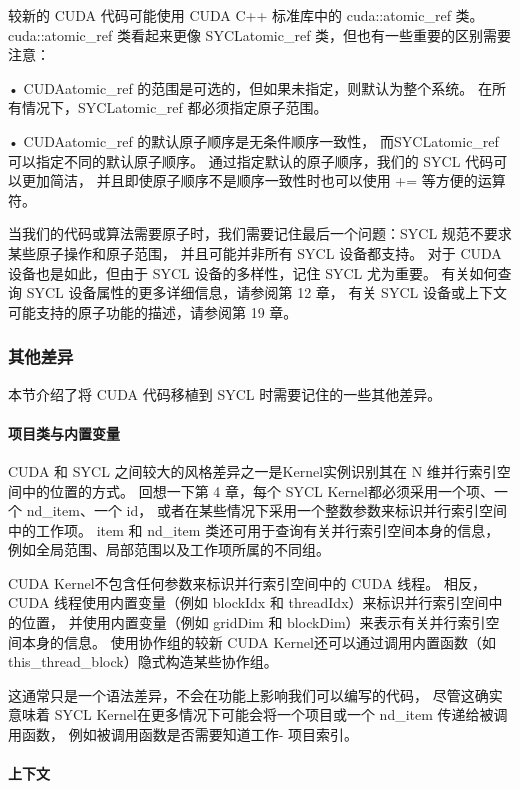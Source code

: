 较新的 CUDA 代码可能使用 CUDA C++ 标准库中的 cuda::atomic\_ref 类。 
cuda::atomic\_ref 类看起来更像 SYCLatomic\_ref 类，但也有一些重要的区别需要注意：

• CUDAatomic\_ref 的范围是可选的，但如果未指定，则默认为整个系统。 
在所有情况下，SYCLatomic\_ref 都必须指定原子范围。

• CUDAatomic\_ref 的默认原子顺序是无条件顺序一致性，
而SYCLatomic\_ref 可以指定不同的默认原子顺序。 
通过指定默认的原子顺序，我们的 SYCL 代码可以更加简洁，
并且即使原子顺序不是顺序一致性时也可以使用 += 等方便的运算符。

当我们的代码或算法需要原子时，我们需要记住最后一个问题：SYCL 规范不要求某些原子操作和原子范围，
并且可能并非所有 SYCL 设备都支持。 对于 CUDA 设备也是如此，但由于 SYCL 设备的多样性，记住 SYCL 尤为重要。 
有关如何查询 SYCL 设备属性的更多详细信息，请参阅第 12 章，
有关 SYCL 设备或上下文可能支持的原子功能的描述，请参阅第 19 章。

\subsubsection{其他差异}
本节介绍了将 CUDA 代码移植到 SYCL 时需要记住的一些其他差异。

\paragraph{项目类与内置变量}

CUDA 和 SYCL 之间较大的风格差异之一是Kernel实例识别其在 N 维并行索引空间中的位置的方式。 
回想一下第 4 章，每个 SYCL Kernel都必须采用一个项、一个 nd\_item、一个 id，
或者在某些情况下采用一个整数参数来标识并行索引空间中的工作项。 
item 和 nd\_item 类还可用于查询有关并行索引空间本身的信息，例如全局范围、局部范围以及工作项所属的不同组。

CUDA Kernel不包含任何参数来标识并行索引空间中的 CUDA 线程。 
相反，CUDA 线程使用内置变量（例如 blockIdx 和 threadIdx）来标识并行索引空间中的位置，
并使用内置变量（例如 gridDim 和 blockDim）来表示有关并行索引空间本身的信息。 
使用协作组的较新 CUDA Kernel还可以通过调用内置函数（如 this\_thread\_block）隐式构造某些协作组。

这通常只是一个语法差异，不会在功能上影响我们可以编写的代码，
尽管这确实意味着 SYCL Kernel在更多情况下可能会将一个项目或一个 nd\_item 传递给被调用函数，
例如被调用函数是否需要知道工作- 项目索引。

\paragraph{上下文}

